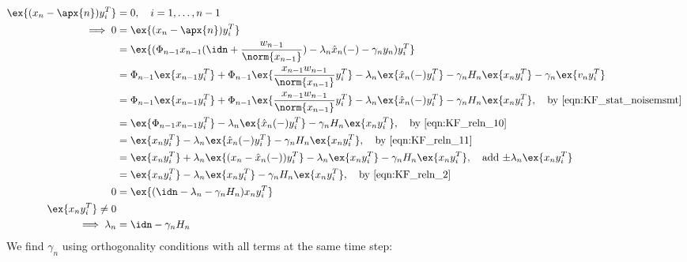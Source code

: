 \begin{align}
\ex{(x_n - \apx{n})y_i^T} &=0, \quad i = 1,\dots, n-1\label{eqn:KF_reln_15}\\ 
\implies 0 &= \ex{(x_n - \apx{n})y_i^T} \\
& = \ex{(\Phi_{n-1}x_{n-1}(\idn + \frac{w_{n-1}}{\norm{x_{n-1}}}) - \lambda_n \hat{x}_n(-) - \gamma_n y_n)y_i^T} \\
&= \Phi_{n-1}\ex{x_{n-1}y_i^T} + \Phi_{n-1}\ex{\frac{x_{n-1}w_{n-1}}{\norm{x_{n-1}}}y_i^T} - \lambda_n \ex{ \hat{x}_n(-)y_i^T} - \gamma_n H_n \ex{ x_n y_i^T} - \gamma_n \ex{ v_n y_i^T} \\
&= \Phi_{n-1}\ex{x_{n-1}y_i^T} + \Phi_{n-1}\ex{\frac{x_{n-1}w_{n-1}}{\norm{x_{n-1}}}y_i^T} - \lambda_n \ex{ \hat{x}_n(-)y_i^T} - \gamma_n H_n\ex{ x_n y_i^T}, \quad \text{by \ref{eqn:KF_stat_noisemsmt} } \\
&= \ex{\Phi_{n-1}x_{n-1}y_i^T} - \lambda_n \ex{ \hat{x}_n(-)y_i^T} - \gamma_n H_n\ex{ x_n y_i^T}, \quad \text{by \ref{eqn:KF_reln_10} } \\
&=\ex{x_{n}y_i^T} - \lambda_n \ex{ \hat{x}_n(-)y_i^T} - \gamma_n H_n\ex{ x_n y_i^T}, \quad \text{by \ref{eqn:KF_reln_11}} \\
&= \ex{x_{n}y_i^T} + \lambda_n \ex{( x_n - \hat{x}_n(-))y_i^T} - \lambda_n \ex{ x_n y_i^T} - \gamma_n H_n\ex{ x_n y_i^T}, \quad \text{add $\pm \lambda_n \ex{ x_n y_i^T}$} \\
&= \ex{x_{n}y_i^T} - \lambda_n \ex{ x_n y_i^T} - \gamma_n H_n\ex{ x_n y_i^T}, \quad \text{by \ref{eqn:KF_reln_2}} \\
0 &= \ex{(\idn - \lambda_n  - \gamma_n H_n)x_n y_i^T} \\
\ex{x_n y_i^T} \neq 0 \\
\implies \lambda_n &= \idn  - \gamma_n H_n
\end{align}
We find $\gamma_n$ using orthogonality conditions with all terms at the same time step:
